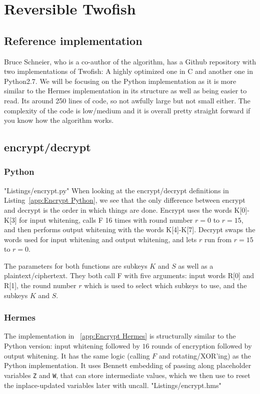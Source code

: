 \section{Reversible Twofish}
\subsection{Reference implementation}
Bruce Schneier, who is a co-author of the algorithm, has a Github repository\cite{GIT2F} with two implementations of Twofish: A highly optimized one in C and another one in Python2.7.
We will be focusing on the Python implementation as it is more similar to the Hermes implementation in its structure as well as being easier to read.
Its around 250 lines of code, so not awfully large but not small either.
The complexity of the code is low/medium and it is overall pretty straight forward if you know how the algorithm works.

\subsection{encrypt/decrypt}
\subsubsection{Python}
 {"Listings/encrypt.py"}
When looking at the encrypt/decrypt definitions in Listing~\ref{app:Encrypt Python}, we see that the only difference between encrypt and decrypt is the order in which things are done.
Encrypt uses the words K[0]-K[3] for input whitening, calls F 16 times with round number $r = 0$ to $r = 15$, and then performs output whitening with the words K[4]-K[7].
Decrypt swaps the words used for input whitening and output whitening, and lets $r$ run from $r = 15$ to $r = 0$. 

The parameters for both functions are subkeys $K$ and $S$ as well as a plaintext/ciphertext.
They both call F with five arguments: input words R[0] and R[1], the round number $r$ which is used to select which subkeys to use, and the subkeys $K$ and $S$.

\subsubsection{Hermes}
The implementation in ~\ref{app:Encrypt Hermes} is structurally similar to the Python version: input whitening followed by $16$ rounds of encryption followed by output whitening. It has the same logic (calling $F$ and rotating/XOR'ing) as the Python implementation. It uses Bennett embedding of passing along placeholder variables \lstinline{Z} and \lstinline{W}, that can store intermediate values, which we then use to reset the inplace-updated variables later with uncall.
 {"Listings/encrypt.hms"}

